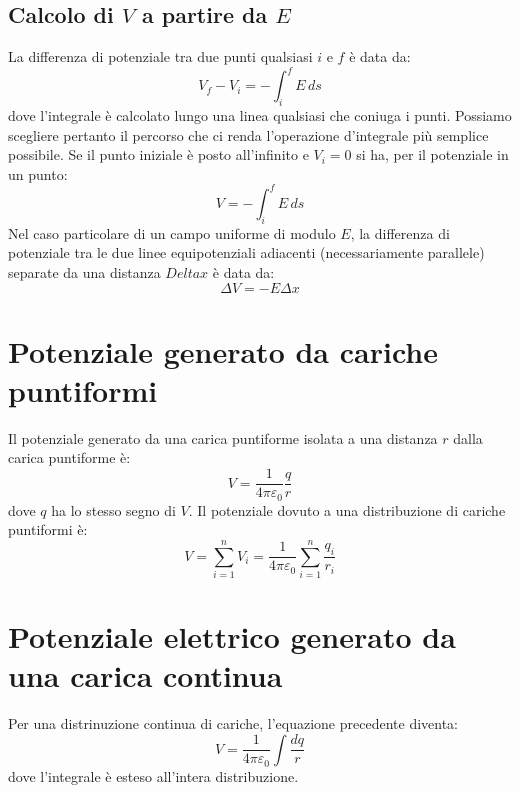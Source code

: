             \subsection{Calcolo di $V$ a partire da $E$} La differenza di 
            potenziale tra due punti qualsiasi $i$ e $f$ è data da:
                \begin{equation}
                    V_f - V_i = - \int_{i}^{f} E \,ds
                \end{equation}
            dove l'integrale è calcolato lungo una linea qualsiasi che coniuga 
            i punti. Possiamo scegliere pertanto il percorso che ci renda 
            l'operazione d'integrale più semplice possibile. Se il punto 
            iniziale è posto all'infinito e $V_i = 0$ si ha, per il potenziale
            in un punto:
                \begin{equation}
                    V = -\int_{i}^{f} E \,ds
                \end{equation}
            Nel caso particolare di un campo uniforme di modulo $E$, la 
            differenza di potenziale tra le due linee equipotenziali adiacenti
            (necessariamente parallele) separate da una distanza $Delta x$ è 
            data da:
                \begin{equation}
                    \Delta V = -E\Delta x
                \end{equation}

        \section{Potenziale generato da cariche puntiformi} Il potenziale 
        generato da una carica puntiforme isolata a una distanza $r$ dalla 
        carica puntiforme è:
            \begin{equation}
                V = \frac{1}{4\pi\varepsilon_0}\frac{q}{r}
            \end{equation}
        dove $q$ ha lo stesso segno di $V$. Il potenziale dovuto a una 
        distribuzione di cariche puntiformi è:
            \begin{equation}
                V = \sum_{i = 1}^{n}V_i = \frac{1}{4\pi\varepsilon_0}
                \sum_{i = 1}^{n}\frac{q_i}{r_i}
            \end{equation}

        \section{Potenziale elettrico generato da una carica continua} Per una 
        distrinuzione continua di cariche, l'equazione precedente diventa:
            \begin{equation}
                V = \frac{1}{4\pi\varepsilon_0}\int \frac{dq}{r}
            \end{equation}
        dove l'integrale è esteso all'intera distribuzione.

